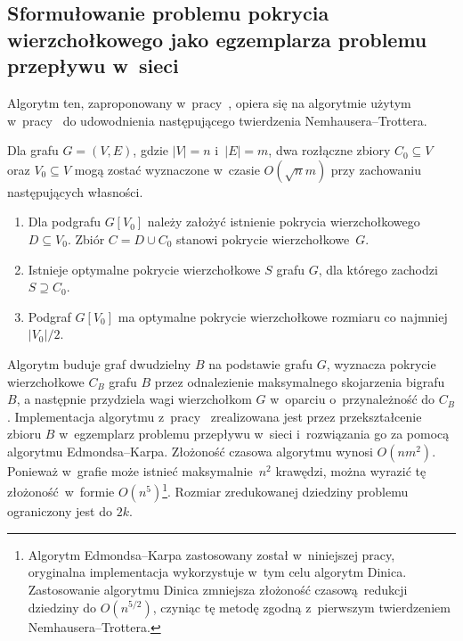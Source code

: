 \subsection{Sformułowanie problemu pokrycia wierzchołkowego jako egzemplarza problemu przepływu w~sieci}\label{Kernelization_network_flow}
Algorytm ten, zaproponowany w~pracy~\cite{KernelizationAlgorithms04}, opiera się na
algorytmie użytym w~pracy~\cite{Niedermeier02} do udowodnienia następującego twierdzenia
Nemhausera--Trottera.

\begin{theorem}
  Dla grafu $G=(V,E)$, gdzie $|V|=n$ i~$|E|=m$, dwa rozłączne zbiory $C_0 \subseteq V$ oraz $V_0 \subseteq V$ mogą zostać wyznaczone w~czasie $O(\sqrt{n}m)$ przy zachowaniu następujących własności.
  \begin{enumerate}
    \item Dla podgrafu $G[V_0]$ należy założyć istnienie pokrycia wierzchołkowego $D \subseteq V_0$.
    Zbiór $C = D \cup C_0$ stanowi pokrycie wierzchołkowe~$G$.
    \item Istnieje optymalne pokrycie wierzchołkowe $S$ grafu $G$, dla którego zachodzi $S \supseteq C_0$.
    \item Podgraf $G[V_0]$ ma optymalne pokrycie wierzchołkowe rozmiaru co najmniej $|V_0|/2$. 
  \end{enumerate}
\end{theorem}

Algorytm buduje graf dwudzielny $B$ na podstawie grafu $G$, wyznacza pokrycie wierzchołkowe $C_B$ grafu $B$ przez odnalezienie maksymalnego skojarzenia bigrafu $B$,
a następnie przydziela wagi wierzchołkom $G$ w~oparciu o~przynależność do $C_B$.
Implementacja algorytmu z~pracy~\cite{Niedermeier02} zrealizowana jest przez
przekształcenie zbioru $B$ w~egzemplarz problemu przepływu w~sieci i~rozwiązania go za pomocą algorytmu Edmondsa--Karpa.
Złożoność czasowa algorytmu wynosi $O(nm^2)$.
Ponieważ w~grafie może istnieć maksymalnie~$n^2$ krawędzi, można wyrazić tę złożoność~w~formie $O(n^5)$\footnote{Algorytm Edmondsa--Karpa
  zastosowany został w~niniejszej pracy, oryginalna implementacja wykorzystuje w~tym celu algorytm Dinica. Zastosowanie algorytmu Dinica zmniejsza złożoność czasową redukcji dziedziny do $O(n^{5/2})$, czyniąc tę metodę zgodną z~pierwszym twierdzeniem Nemhausera--Trottera.}.
Rozmiar zredukowanej dziedziny problemu ograniczony jest do $2k$.

